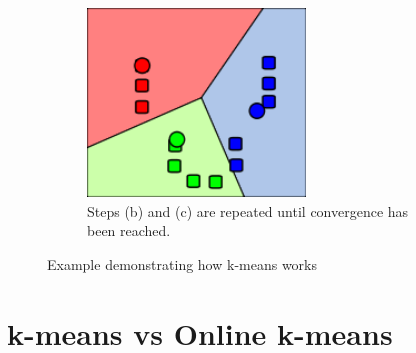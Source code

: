 \documentclass{article}
\begin{document}
\begin{figure}
    \begin{subfigure}{0.5\textwidth}
        \includegraphics[width=0.9\linewidth, height=5cm]{Pictures/K_Means_Example_Step_4.png}
        \caption{Steps (b) and (c) are repeated until convergence has been reached.}
    \end{subfigure}
\caption{Example demonstrating how k-means works}

\end{figure}

\section{k-means vs Online k-means}
\end{document}
